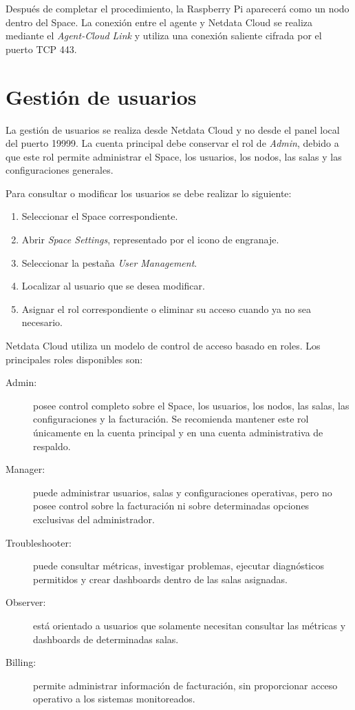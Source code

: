 Después de completar el procedimiento, la Raspberry Pi aparecerá como un nodo dentro
del Space. La conexión entre el agente y Netdata Cloud se realiza mediante el
\textit{Agent-Cloud Link} y utiliza una conexión saliente cifrada por el puerto TCP 443.



\section{Gestión de usuarios}

La gestión de usuarios se realiza desde Netdata Cloud y no desde el panel local del
puerto 19999. La cuenta principal debe conservar el rol de \textit{Admin}, debido a que
este rol permite administrar el Space, los usuarios, los nodos, las salas y las
configuraciones generales.

Para consultar o modificar los usuarios se debe realizar lo siguiente:

\begin{enumerate}
    \item Seleccionar el Space correspondiente.
    \item Abrir \textit{Space Settings}, representado por el icono de engranaje.
    \item Seleccionar la pestaña \textit{User Management}.
    \item Localizar al usuario que se desea modificar.
    \item Asignar el rol correspondiente o eliminar su acceso cuando ya no sea necesario.
\end{enumerate}

Netdata Cloud utiliza un modelo de control de acceso basado en roles. Los principales
roles disponibles son:

\begin{description}
    \item[Admin:] posee control completo sobre el Space, los usuarios, los nodos, las
    salas, las configuraciones y la facturación. Se recomienda mantener este rol
    únicamente en la cuenta principal y en una cuenta administrativa de respaldo.

    \item[Manager:] puede administrar usuarios, salas y configuraciones operativas, pero
    no posee control sobre la facturación ni sobre determinadas opciones exclusivas del
    administrador.

    \item[Troubleshooter:] puede consultar métricas, investigar problemas, ejecutar
    diagnósticos permitidos y crear dashboards dentro de las salas asignadas.

    \item[Observer:] está orientado a usuarios que solamente necesitan consultar las
    métricas y dashboards de determinadas salas.

    \item[Billing:] permite administrar información de facturación, sin proporcionar
    acceso operativo a los sistemas monitoreados.
\end{description}

